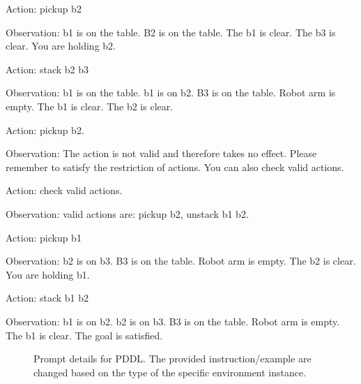 \begin{tcolorbox}[breakable,title=Prompt Details for PDDL ]
Action: pickup b2

Observation: b1 is on the table.  B2 is on the table.  The b1 is clear. The b3 is clear. You are holding b2.  

Action: stack b2 b3

Observation: b1 is on the table.  b1 is on b2. B3 is on the table. Robot arm is empty. The b1 is clear. The b2 is clear. 

Action: pickup b2. 

Observation: The action is not valid and therefore takes no effect. Please remember to satisfy the restriction of actions. You can also check valid actions. 

Action: check valid actions. 

Observation: valid actions are: pickup b2, unstack b1 b2.


Action: pickup b1

Observation: b2 is on b3. B3 is on the table.  Robot arm is empty. The b2 is clear.  You are holding b1. 

Action: stack b1 b2

Observation: b1 is on b2. b2 is on b3. B3 is on the table.  Robot arm is empty. The b1 is clear. The goal is satisfied.

\end{tcolorbox}
\begin{figure}[!h]
    \vspace{0.01cm}
    \caption{Prompt details for PDDL. The provided instruction/example are changed based on the type of the specific environment instance.}
    \label{fig:pddl_prompt}
\end{figure}